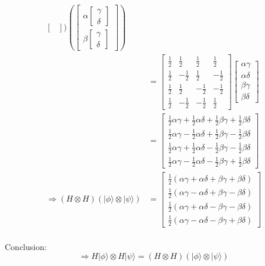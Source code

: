 \documentclass{article}
\begin{document}
\begin{equation}
\begin{split}
\begin{bmatrix}
            \end{bmatrix}
        ) (
            \begin{bmatrix}
                \alpha\begin{bmatrix}
                    \gamma \\ \delta
                \end{bmatrix} \\
                \beta\begin{bmatrix}
                    \gamma \\ \delta
                \end{bmatrix}
            \end{bmatrix}
        ) \\
        & = \begin{bmatrix}
            \frac{1}{2} & \frac{1}{2} & \frac{1}{2} & \frac{1}{2} \\
            \frac{1}{2} & -\frac{1}{2} & \frac{1}{2} & -\frac{1}{2} \\
            \frac{1}{2} & \frac{1}{2} & -\frac{1}{2} & -\frac{1}{2} \\
            \frac{1}{2} & -\frac{1}{2} & -\frac{1}{2} & \frac{1}{2}
        \end{bmatrix} \begin{bmatrix}
            \alpha\gamma \\
            \alpha\delta \\
            \beta\gamma \\
            \beta\delta
        \end{bmatrix} \\
        & = \begin{bmatrix}
            \frac{1}{2}\alpha\gamma + \frac{1}{2}\alpha\delta + \frac{1}{2}\beta\gamma + \frac{1}{2}\beta\delta \\
            \frac{1}{2}\alpha\gamma - \frac{1}{2}\alpha\delta + \frac{1}{2}\beta\gamma - \frac{1}{2}\beta\delta \\
            \frac{1}{2}\alpha\gamma + \frac{1}{2}\alpha\delta - \frac{1}{2}\beta\gamma - \frac{1}{2}\beta\delta \\
            \frac{1}{2}\alpha\gamma - \frac{1}{2}\alpha\delta - \frac{1}{2}\beta\gamma + \frac{1}{2}\beta\delta
        \end{bmatrix} \\
        \Longrightarrow (H \otimes H)(|\phi\rangle \otimes |\psi\rangle) & = \begin{bmatrix}
            \frac{1}{2}(\alpha\gamma + \alpha\delta + \beta\gamma + \beta\delta) \\
            \frac{1}{2}(\alpha\gamma - \alpha\delta + \beta\gamma - \beta\delta) \\
            \frac{1}{2}(\alpha\gamma + \alpha\delta - \beta\gamma - \beta\delta) \\
            \frac{1}{2}(\alpha\gamma - \alpha\delta - \beta\gamma + \beta\delta)
        \end{bmatrix} \\
    \end{split}
\end{equation}

Conclusion:
\begin{equation}
    \Longrightarrow H|\phi\rangle \otimes H|\psi\rangle = (H \otimes H)(|\phi\rangle \otimes |\psi\rangle)
\end{equation}
\end{document}
